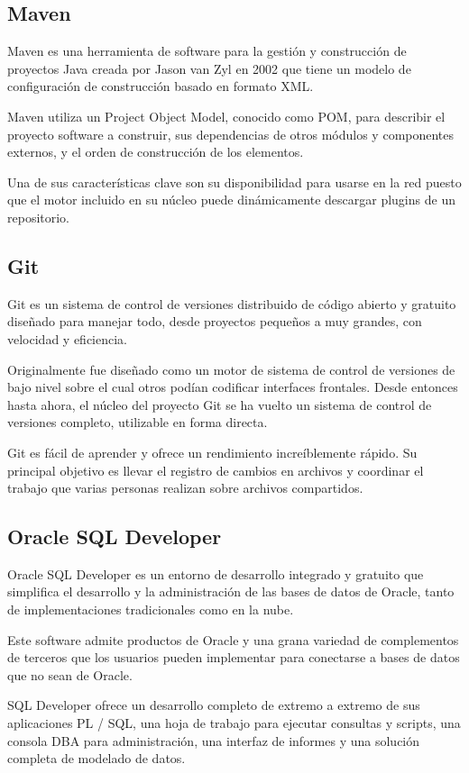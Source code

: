 \subsection{Maven}
Maven es una herramienta de software para la gestión y construcción de proyectos Java creada por Jason van Zyl en 2002 que tiene un modelo de configuración de construcción basado en formato XML.

Maven utiliza un Project Object Model, conocido como POM, para describir el proyecto software a construir, sus dependencias de otros módulos y componentes externos, y el orden de construcción de los elementos.

Una de sus características clave son su disponibilidad para usarse en la red puesto que el motor incluido en su núcleo puede dinámicamente descargar plugins de un repositorio.


\subsection{Git}
Git es un sistema de control de versiones distribuido de código abierto y gratuito diseñado para manejar todo, desde proyectos pequeños a muy grandes, con velocidad y eficiencia.

Originalmente fue diseñado como un motor de sistema de control de versiones de bajo nivel sobre el cual otros podían codificar interfaces frontales. Desde entonces hasta ahora, el núcleo del proyecto Git se ha vuelto un sistema de control de versiones completo, utilizable en forma directa.

Git es fácil de aprender y ofrece un rendimiento increíblemente rápido. Su principal objetivo es llevar el registro de cambios en archivos y coordinar el trabajo que varias personas realizan sobre archivos compartidos.


\subsection{Oracle SQL Developer}
Oracle SQL Developer es un entorno de desarrollo integrado y gratuito que simplifica el desarrollo y la administración de las bases de datos de Oracle, tanto de implementaciones tradicionales como en la nube.

Este software admite productos de Oracle y una grana variedad de complementos de terceros que los usuarios pueden implementar para conectarse a bases de datos que no sean de Oracle.

SQL Developer ofrece un desarrollo completo de extremo a extremo de sus aplicaciones PL / SQL, una hoja de trabajo para ejecutar consultas y scripts, una consola DBA para administración, una interfaz de informes y una solución completa de modelado de datos.



